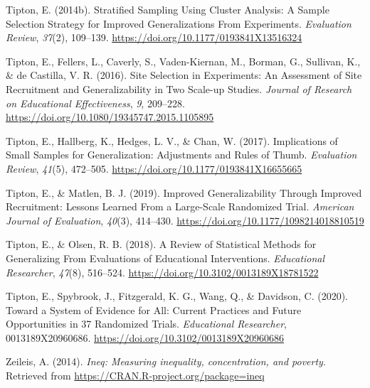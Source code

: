 \documentclass[
  man,floatsintext]{apa6}
\newlength{\cslhangindent}
\newlength{\cslentryspacingunit} %
\newenvironment{CSLReferences}[2] %
 {%
  \setlength{\parindent}{0pt}
  \ifodd #1
  \let\oldpar\par
  \def\par{\hangindent=\cslhangindent\oldpar}
  \fi
  \setlength{\parskip}{#2\cslentryspacingunit}
 }%
 {}
\begin{document}
\begin{CSLReferences}{1}{0}
\leavevmode{}%
Tipton, E. (2014b). Stratified {Sampling Using Cluster Analysis}: {A Sample Selection Strategy} for {Improved Generalizations From Experiments}. \emph{Evaluation Review}, \emph{37}(2), 109--139. \url{https://doi.org/10.1177/0193841X13516324}

\leavevmode{}%
Tipton, E., Fellers, L., Caverly, S., Vaden-Kiernan, M., Borman, G., Sullivan, K., \& de Castilla, V. R. (2016). Site {Selection} in {Experiments}: {An Assessment} of {Site Recruitment} and {Generalizability} in {Two Scale}-up {Studies}. \emph{Journal of Research on Educational Effectiveness}, \emph{9}, 209--228. \url{https://doi.org/10.1080/19345747.2015.1105895}

\leavevmode{}%
Tipton, E., Hallberg, K., Hedges, L. V., \& Chan, W. (2017). Implications of {Small Samples} for {Generalization}: {Adjustments} and {Rules} of {Thumb}. \emph{Evaluation Review}, \emph{41}(5), 472--505. \url{https://doi.org/10.1177/0193841X16655665}

\leavevmode{}%
Tipton, E., \& Matlen, B. J. (2019). Improved {Generalizability Through Improved Recruitment}: {Lessons Learned From} a {Large}-{Scale Randomized Trial}. \emph{American Journal of Evaluation}, \emph{40}(3), 414--430. \url{https://doi.org/10.1177/1098214018810519}

\leavevmode{}%
Tipton, E., \& Olsen, R. B. (2018). A {Review} of {Statistical} {Methods} for {Generalizing} {From} {Evaluations} of {Educational} {Interventions}. \emph{Educational Researcher}, \emph{47}(8), 516--524. \url{https://doi.org/10.3102/0013189X18781522}

\leavevmode{}%
Tipton, E., Spybrook, J., Fitzgerald, K. G., Wang, Q., \& Davidson, C. (2020). Toward a {System} of {Evidence} for {All}: {Current Practices} and {Future Opportunities} in 37 {Randomized Trials}. \emph{Educational Researcher}, 0013189X20960686. \url{https://doi.org/10.3102/0013189X20960686}

\leavevmode{}%
Zeileis, A. (2014). \emph{Ineq: Measuring inequality, concentration, and poverty}. Retrieved from \url{https://CRAN.R-project.org/package=ineq}

\end{CSLReferences}
\end{document}

